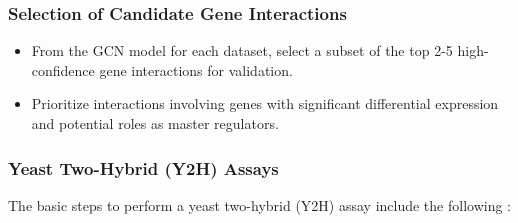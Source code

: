 \documentclass{article}
\begin{document}
\subsubsection{Selection of Candidate Gene Interactions}
\begin{itemize}
    \item From the GCN model for each dataset, select a subset of the top 2-5 high-confidence gene interactions for validation.
    \item Prioritize interactions involving genes with significant differential expression and potential roles as master regulators.
\end{itemize}

\subsubsection{Yeast Two-Hybrid (Y2H) Assays} 
The basic steps to perform a yeast two-hybrid (Y2H) assay \cite{lopez2017mapping} include the following :
\end{document}
